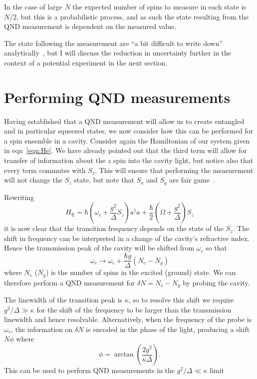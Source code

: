 \documentclass{article}
\begin{document}
In the case of large $N$ the expected number of spins to measure in each state
is $N/2$, but this is a probabilistic process, and as such the state resulting
from the QND measurement is dependent on the measured value.


The state following the measurement are ``a bit difficult to write down''
analytically~\cite{Cox2016}, but I will discuss the reduction in uncertainty
further in the context of a potential experiment in the next section.

\section{Performing QND measurements}

Having established that a QND measurement will allow us to create entangled
and in particular squeezed states, we now consider how this can be performed
for a spin ensemble in a cavity. Consider again the Hamiltonian of our system
given in eqn~\ref{eqn:He}. We have already pointed out that the
third term will allow for transfer of information about the $z$ spin into the
cavity light, but notice also that every term commutes with $S_z$. This will
ensure that performing the measurement will not change the $S_z$ state, but
note that $S_x$ and $S_y$ are fair game~\cite{SchleierSmith2011}.

Rewriting
%
\begin{equation}
  H_\text{E}= 
    \hbar \left(\omega_c + \frac{g^2}{\Delta}S_z\right)a^\dagger a + 
    \frac{\hbar}{2}\left(\Omega + \frac{g^2}{\Delta}\right)S_z
\end{equation}
%
it is now clear that the transition frequency depends on the state of the
$S_z$. The shift in frequency can be interpreted in a change of the cavity's
refractive index. Hence the transmission peak of the cavity will be shifted
from $\omega_c$ so that
%
\begin{equation}
  \omega_c \rightarrow \omega_c + \frac{\hbar g}{\Delta}(N_e - N_g)
\end{equation}
%
where $N_e$ ($N_g$) is the number of spins in the excited (ground) state. We
can therefore perform a QND measurement for $\delta N = N_e - N_g$ by probing
the cavity.

The linewidth of the transition peak is $\kappa$, so to resolve this shift we
require $g^2/ \Delta \gg \kappa$ for the shift of the frequency to be larger
than the transmission linewidth and hence resolvable. Alternatively, when the
frequency of the probe is $\omega_r$, the information on $\delta N$ is encoded
in the phase of the light, producing a shift $N\phi$ where
%
\begin{equation}
  \phi = \arctan \left(\frac{2g^2}{\kappa \Delta}\right).
\end{equation}
%
This can be used to perform QND measurements in the $g^2/ \Delta \ll
\kappa$ limit~\cite{PhysRevA.69.062320}
\end{document}
